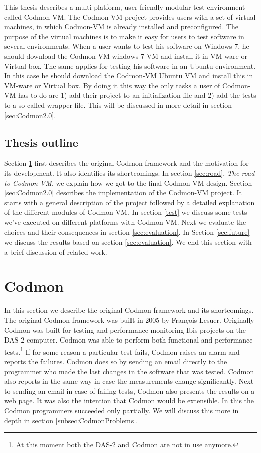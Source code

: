 \documentclass{article}
\newcommand{\project}{Codmon-VM}
\begin{document}
\noindent This thesis describes a multi-platform, user friendly modular test environment called \project{}. The \project{} project provides users with a set of virtual machines,
in which \project{} is already installed and preconfigured. The purpose of the virtual machines is to make it easy for users to test software in several environments.  When a user wants to 
test his software on Windows 7, he should download the \project{} windows 7 VM and install it in VM-ware or Virtual box. The same applies for testing his software in an Ubuntu environment. In this case he should 
download the \project{} Ubuntu VM and install this in VM-ware or Virtual box. By doing it this way the  only tasks a user of \project{} has to do are 1) add their project to an initialization file and 2) add 
the tests to a so called wrapper file. This will be discussed in more detail in section \ref{sec:Codmon2.0}.


\subsection{Thesis outline}
\label{subsec:Thesisoutline}
Section \ref{sec:codmon} first describes the original Codmon framework and the motivation for its development. It also identifies its shortcomings. In section \ref{sec:road}, \emph{The road to \project{}}, 
we explain how we got to the final \project{} design. Section \ref{sec:Codmon2.0} describes the implementation of the \project{} project. 
It starts with a general description of the project followed by a detailed explanation of the different modules of \project{}. In section \ref{test} we discuss some tests we've executed on different platforms 
with \project{}. Next we evaluate the choices and their consequences in section \ref{sec:evaluation}. In Section \ref{sec:future} we discuss the results based on section \ref{sec:evaluation}. We end 
this section with a brief discussion of related work.

\newpage
\section{Codmon}
\label{sec:codmon}
In this section we describe the original Codmon framework and its shortcomings. The original Codmon framework was built in 2005 by François Lesuer\cite{Codmon}. Originally Codmon was built for 
testing and performance monitoring Ibis projects\cite{Ibis,Satin,MPJ,IPL,GMI} on the DAS-2\cite{das2} computer. Codmon was able to perform both functional and performance tests.\footnote{At 
this moment both the DAS-2 and Codmon are not in use anymore.} If for some reason a particular test fails, Codmon raises an alarm and reports the failures. Codmon does so by 
sending an email directly to the programmer who made the last changes in the software that was tested. Codmon also reports in the same way in case the measurements change significantly. 
Next to sending an email in case of failing tests, Codmon also presents the results on a web page. It was also the intention that Codmon would be extensible. In this the Codmon programmers 
succeeded only partially. We will discuss this more in depth in section \ref{subsec:CodmonProblems}.  
\end{document}
